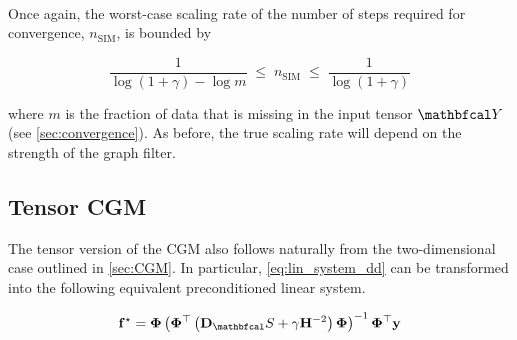 \begin{algorithm}[t]
\begin{algorithmic}
        \vspace{0.15cm}
        \vspace{0.25cm}
        \EndFor
        \EndFor \\
        \hspace*{0.1cm} 
        \EndFor
        \vspace{0.5cm}
        \vspace{0.15cm}
        \State{$ \Ft  \leftarrow \Delta\Ft$}
        \vspace{0.15cm}
        \vspace{0.15cm}
        \vspace{0.15cm}
        \State{$ \Ft \leftarrow  \Ft  + \Delta\Ft$}
        \vspace{0.15cm}
        \EndWhile
        \vspace{0.5cm}
        \Ensure{$ \Ft $}
        \vspace{0.15cm}
        \label{al:SIM_dd}
    \end{algorithmic}
\end{algorithm}

Once again, the worst-case scaling rate of the number of steps required for convergence, $n_{\text{SIM}}$, is bounded by

$$
\frac{1}{\log(1 + \gamma) - \log m} \; \leq \; n_{\text{SIM}} \; \leq \; \frac{1}{\log(1 + \gamma)}
$$

where $m$ is the fraction of data that is missing in the input tensor $\Yt$ (see \cref{sec:convergence}). As before, the true scaling rate will depend on the strength of the graph filter. 

\subsection{Tensor CGM}

The tensor version of the CGM also follows naturally from the two-dimensional case outlined in \cref{sec:CGM}. In particular, \cref{eq:lin_system_dd} can be transformed into the following equivalent preconditioned linear system. 

\begin{equation}
    \label{eq:lin_system_precon_dd}
    \f^{\star} = \PHI \left( \PHI^\top \left(\D_\St + \gamma \HH^{-2}\right)\PHI \right)^{-1}\PHI^\top \y
\end{equation}

